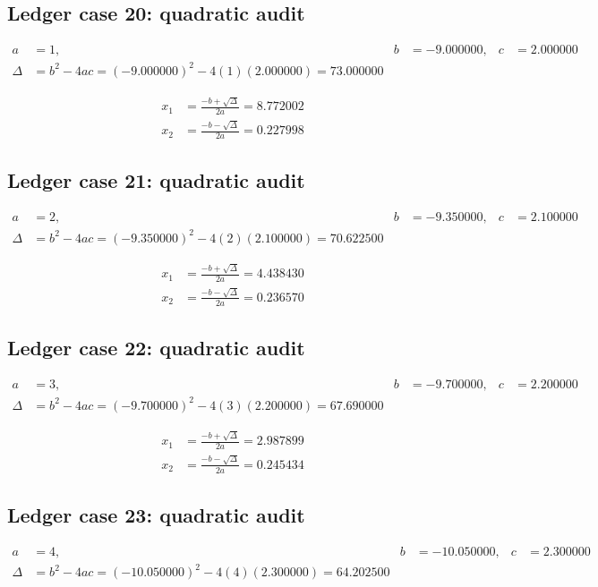 \documentclass[11pt,a4paper]{article}
\begin{document}
\subsection{Ledger case 20: quadratic audit}
\begin{align}
a &= 1, & b &= -9.000000, & c &= 2.000000 \\
\Delta &= b^2-4ac = (-9.000000)^2 - 4(1)(2.000000) = 73.000000
\end{align}

\begin{align}
x_1 &= \frac{-b+\sqrt{\Delta}}{2a} = 8.772002 \\
x_2 &= \frac{-b-\sqrt{\Delta}}{2a} = 0.227998
\end{align}

\subsection{Ledger case 21: quadratic audit}
\begin{align}
a &= 2, & b &= -9.350000, & c &= 2.100000 \\
\Delta &= b^2-4ac = (-9.350000)^2 - 4(2)(2.100000) = 70.622500
\end{align}

\begin{align}
x_1 &= \frac{-b+\sqrt{\Delta}}{2a} = 4.438430 \\
x_2 &= \frac{-b-\sqrt{\Delta}}{2a} = 0.236570
\end{align}

\newpage

\subsection{Ledger case 22: quadratic audit}
\begin{align}
a &= 3, & b &= -9.700000, & c &= 2.200000 \\
\Delta &= b^2-4ac = (-9.700000)^2 - 4(3)(2.200000) = 67.690000
\end{align}

\begin{align}
x_1 &= \frac{-b+\sqrt{\Delta}}{2a} = 2.987899 \\
x_2 &= \frac{-b-\sqrt{\Delta}}{2a} = 0.245434
\end{align}

\subsection{Ledger case 23: quadratic audit}
\begin{align}
a &= 4, & b &= -10.050000, & c &= 2.300000 \\
\Delta &= b^2-4ac = (-10.050000)^2 - 4(4)(2.300000) = 64.202500
\end{align}
\end{document}
